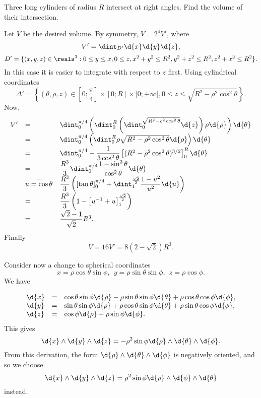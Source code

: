 \begin{exa}\label{exa:3cylinders}
Three long cylinders of radius $R$ intersect at right angles. Find
the volume of their intersection.
\end{exa}
\begin{solu} Let $V$ be the desired volume. By symmetry, $V = 2^4V'$, where
$$V' = \dint _{D'} \d{x} \d{y}  \d{z},$$
$$D' = \{(x, y, z)\in \reals^3: 0 \leq y \leq x, 0 \leq z, x^2 + y^2 \leq R^2, y^2 + z^2 \leq R^2, z^2 + x^2 \leq R^2\}.$$
In this case it is easier to integrate with respect to $z$ first.
Using cylindrical coordinates
$$\Delta' = \left\{(\theta, \rho, z)\in \left[0;\dfrac{\pi}{4}\right]\times [0; R]\times [0; +\infty[,
0 \leq z \leq \sqrt{R^2 - \rho^2\cos^2\theta}\right\}.$$ Now,
$$\begin{array}{lll}
V' & = & \dint _0 ^{\pi/4}\left(\dint _0 ^R \left( \dint _0 ^{\sqrt{R^2
- \rho^2\cos^2\theta}} \d{z}\right)\rho \d{\rho}
\right) \d{\theta} \\
& = & \dint _0 ^{\pi/4}\left(\dint _0 ^R \rho\sqrt{R^2 -
\rho^2\cos^2\theta} \d{\rho}
\right) \d{\theta} \\
& = & \dint _0 ^{\pi/4}-\dfrac{1}{3\cos^2\theta}\left[ (R^2 -
\rho^2\cos^2\theta)^{3/2}
\right] _0 ^R \d{\theta} \\
& =  & \dfrac{R^3}{3}\dint _0 ^{\pi/4} \dfrac{1 - \sin^3\theta}{\cos^2\theta} \d{\theta} \\
& \stackrel{=}{u = \cos\theta} &
\dfrac{R^3}{3}\left([\tan\theta]_0 ^{\pi/4} + \dint _1
^{\frac{\sqrt{2}}{2}} \dfrac{1 - u^2}{u^2}\d{u}\right) \\
& = &  \dfrac{R^3}{3}\left(1 - \left[u^{-1} + u\right] _1
^{\frac{\sqrt{2}}{2}}\right)
\\
& = & \dfrac{\sqrt{2} - 1}{\sqrt{2}}R^3.
\end{array}$$
Finally
$$V = 16V' = 8(2 - \sqrt{2})R^3.$$
\end{solu}



Consider now a change to spherical coordinates
$$ x=\rho\cos\theta\sin\phi, \ \  y=\rho\sin\theta\sin\phi, \ \
z=\rho\cos\phi.
$$ We have

$$\begin{array}{lll} \d{x} & = &
\cos\theta\sin\phi\d{\rho} - \rho\sin\theta\sin\phi\d{\theta} +
\rho\cos\theta\cos\phi\d{\phi},    \\
 \d{y} & = & \sin\theta\sin\phi\d{\rho} +
\rho\cos\theta\sin\phi\d{\theta} + \rho\sin\theta\cos\phi\d{\phi},
\\
  \d{z} & = & \cos\phi\d{\rho} - \rho\sin\phi\d{\phi}.  \end{array}   $$ This
gives
$$\d{x}\wedge\d{y}\wedge\d{z}  = -\rho^2\sin\phi\d{\rho}\wedge\d{\theta}\wedge\d{\phi}.  $$
From this derivation, the form
$\d{\rho}\wedge\d{\theta}\wedge\d{\phi}$ is negatively oriented,
and so we choose
$$\d{x}\wedge\d{y}\wedge\d{z}  = \rho^2\sin\phi\d{\rho}\wedge\d{\phi}\wedge\d{\theta} $$
instead.

